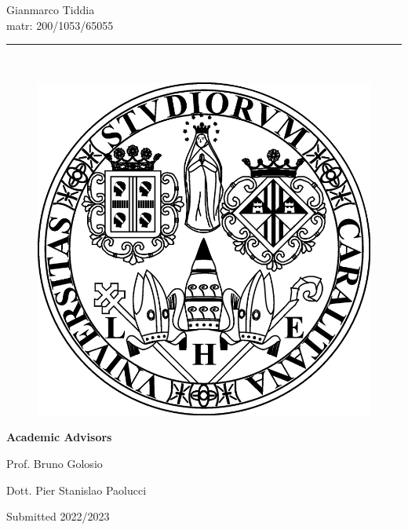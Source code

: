 \documentclass[a4paper, 12pt, twoside, openright]{book}
\begin{document}
\vspace{0.5cm}
\begin{center}
{\LARGE Gianmarco Tiddia}\vspace{0.5cm}\\
{\Large matr: 200/1053/65055}
\end{center}\par
\rule[+0.1\baselineskip]{\textwidth}{0.1mm}\\
\vspace{-1 cm}
\begin{figure} %
    {\includegraphics[scale=6.8]{Logo_Unica_BW_transparent.png}}
\end{figure}
\vspace{1.2 cm}\par
\textbf{\large Academic Advisors}\par\vspace{0.3 cm}
{\large Prof. Bruno Golosio}\par
{\large Dott. Pier Stanislao Paolucci}\par
\vspace{2cm}\par
{\large Submitted 2022/2023}


\fancyfoot[C]{\thepage}
\fancyfoot[R]{}
\end{document}
